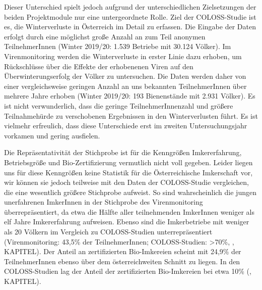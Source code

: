 Dieser Unterschied spielt jedoch aufgrund der unterschiedlichen Zielsetzungen der beiden Projektmodule nur eine untergeordnete Rolle. Ziel der COLOSS-Studie ist es, die Winterverluste in Österreich im Detail zu erfassen. Die Eingabe der Daten erfolgt durch eine möglichst große Anzahl an zum Teil anonymen TeilnehmerInnen (Winter 2019/20: 1.539 Betriebe mit 30.124 Völker). Im Virenmonitoring werden die Winterverluste in erster Linie dazu erhoben, um Rückschlüsse über die Effekte der erhobenenen Viren auf den Überwinterungserfolg der Völker zu untersuchen. Die Daten werden daher von einer vergleichsweise geringen Anzahl an uns bekannten TeilnehmerInnen über mehrere Jahre erhoben (Winter 2019/20: 193 Bienenstände mit 2.931 Völker). Es ist nicht verwunderlich, dass die geringe TeilnehmerInnenzahl und größere Teilnahmehürde zu verschobenen Ergebnissen in den Winterverlusten führt. Es ist vielmehr erfreulich, dass diese Unterschiede erst im zweiten Untersuchungsjahr vorkamen und gering ausfielen.

Die Repräsentativität der Stichprobe ist für die Kenngrößen Imkererfahrung, Betriebsgröße und Bio-Zertifizierung vermutlich nicht voll gegeben. Leider liegen uns für diese Kenngrößen keine Statistik für die Österreichische Imkerschaft vor, wir können sie jedoch teilweise mit den Daten der COLOSS-Studie vergleichen, die eine wesentlich größere Stichprobe aufweist. So sind wahrscheinlich die jungen unerfahrenen ImkerInnen in der Stichprobe des Virenmonitoring überrepräsentiert, da etwa die Hälfte aller teilnehmenden ImkerInnen weniger als elf Jahre Imkererfahrung aufweisen. Ebenso sind die Imkerbetriebe mit weniger als 20 Völkern im Vergleich zu COLOSS-Studien unterrepräsentiert (Virenmonitoring: 43,5\% der TeilnehmerInnen; COLOSS-Studien: >70\%, \cite{brodschneider2018b, brodschneider2019b}, KAPITEL). Der Anteil an zertifizierten Bio-Imkereien scheint mit 24,9\% der TeilnehmerInnen ebenso über dem österreichweiten Schnitt zu liegen. In den COLOSS-Studien lag der Anteil der zertifizierten Bio-Imkereien bei etwa 10\% (\cite{brodschneider2018b, brodschneider2019b}, KAPITEL).

